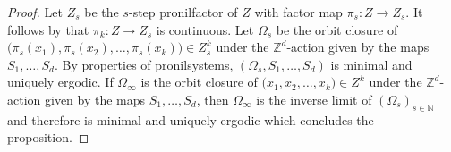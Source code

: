 \documentclass[letter, 11pt]{article}
\newtheorem{lemma}[theo]{Lemma}
\theoremstyle{definition}
\theoremstyle{plain}
\newcommand{\N}{\mathbb{N}}
\newcommand{\Z}{\mathbb{Z}}
\newcommand*\diff{\mathop{}\!\mathrm{d}}
\newcommand{\1}{\mathbbm{1}}
\begin{document}
\begin{proof}
    Let $Z_s$ be the $s$-step pronilfactor of $Z$ with factor map $\pi_s \colon Z \to Z_s$. It follows by \cite{Host_Kra_nonconventional_averages_nilmanifolds:2005} that $\pi_k \colon Z \to Z_s$ is continuous. Let $\Omega_s$ be the orbit closure of $\boldsymbol (\pi_s(x_1), \pi_s(x_2), \ldots, \pi_s(x_k)) \in Z_{s}^{k}$ under the $\Z^d$-action given by the maps $S_1, \ldots, S_d $. By properties of pronilsystems, $(\Omega_s, S_1, \ldots, S_d)$ is minimal and uniquely ergodic. If $\Omega_{\infty}$ is the orbit closure of  $\boldsymbol (x_1, x_2, \ldots, x_k) \in Z^{k}$ under the $\Z^d$-action given by the maps $S_1, \ldots, S_d $, then $\Omega_{\infty}$ is the inverse limit of $(\Omega_{s})_{s\in \N}$ and therefore is minimal and uniquely ergodic which concludes the proposition. 
    \end{proof}

\end{document}
